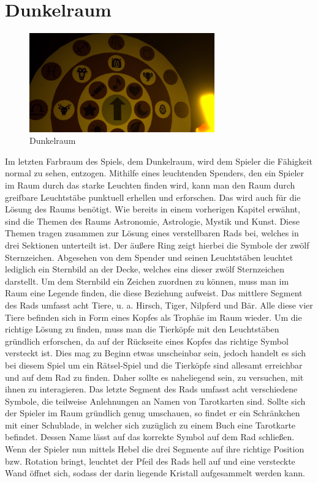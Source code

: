 \section{Dunkelraum}
\begin{figure}
	\vspace*{-0.5cm}
	\includegraphics[width=8cm]{Pictures/Dunkelraum}
	\caption{Dunkelraum}
	\vspace*{-0.5cm}
	\label{fig:dunkelraum}
\end{figure}
Im letzten Farbraum des Spiels, dem Dunkelraum, wird dem Spieler die Fähigkeit normal zu sehen, entzogen. Mithilfe eines leuchtenden Spenders, den ein Spieler im Raum durch das starke Leuchten finden wird, kann man den Raum durch greifbare Leuchtstäbe punktuell erhellen und erforschen. Das wird auch für die Lösung des Raums benötigt. Wie bereits in einem vorherigen Kapitel erwähnt, sind die Themen des Raums Astronomie, Astrologie, Mystik und Kunst. Diese Themen tragen zusammen zur Lösung eines verstellbaren Rads bei, welches in drei Sektionen unterteilt ist. Der äußere Ring zeigt hierbei die Symbole der zwölf Sternzeichen. Abgesehen von dem Spender und seinen Leuchtstäben leuchtet lediglich ein Sternbild an der Decke, welches eins dieser zwölf Sternzeichen darstellt. Um dem Sternbild ein Zeichen zuordnen zu können, muss man im Raum eine Legende finden, die diese Beziehung aufweist. Das mittlere Segment des Rads umfasst acht Tiere, u. a. Hirsch, Tiger, Nilpferd und Bär. Alle diese vier Tiere befinden sich in Form eines Kopfes als Trophäe im Raum wieder. Um die richtige Lösung zu finden, muss man die Tierköpfe mit den Leuchtstäben gründlich erforschen, da auf der Rückseite eines Kopfes das richtige Symbol versteckt ist. Dies mag zu Beginn etwas unscheinbar sein, jedoch handelt es sich bei diesem Spiel um ein Rätsel-Spiel und die Tierköpfe sind allesamt erreichbar und auf dem Rad zu finden. Daher sollte es naheliegend sein, zu versuchen, mit ihnen zu interagieren. Das letzte Segment des Rads umfasst acht verschiedene Symbole, die teilweise Anlehnungen an Namen von Tarotkarten sind. Sollte sich der Spieler im Raum gründlich genug umschauen, so findet er ein Schränkchen mit einer Schublade, in welcher sich zuzüglich zu einem Buch eine Tarotkarte befindet. Dessen Name lässt auf das korrekte Symbol auf dem Rad schließen. Wenn der Spieler nun mittels Hebel die drei Segmente auf ihre richtige Position bzw. Rotation bringt, leuchtet der Pfeil des Rads hell auf und eine versteckte Wand öffnet sich, sodass der darin liegende Kristall aufgesammelt werden kann.
